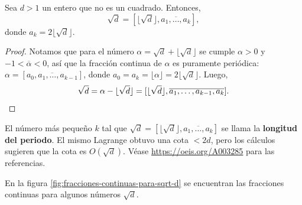 \begin{corolario}
  Sea $d > 1$ un entero que no es un cuadrado. Entonces,
  $$\sqrt{d} = [\lfloor\sqrt{d}\rfloor, \overline{a_1,\ldots,a_k}],$$
  donde $a_k = 2\lfloor\sqrt{d}\rfloor$.

  \begin{proof}
    Notamos que para el número $\alpha = \sqrt{d} + \lfloor\sqrt{d}\rfloor$
    se cumple $\alpha > 0$ y $-1 < \overline{\alpha} < 0$, así que la fracción
    continua de $\alpha$ es puramente periódica:
    $\alpha = [\overline{a_0,a_1,\ldots,a_{k-1}}]$,
    donde $a_0 = a_k = \lfloor\alpha\rfloor = 2\lfloor\sqrt{d}\rfloor$. Luego,
    \[ \sqrt{d} = \alpha - \lfloor\sqrt{d}\rfloor =
       [\lfloor\sqrt{d}\rfloor, \overline{a_1,\ldots,a_{k-1},a_k}]. \qedhere \]
  \end{proof}
\end{corolario}

\begin{comentario}
  El número más pequeño $k$ tal que
  $\sqrt{d} = [\lfloor\sqrt{d}\rfloor, \overline{a_1,\ldots,a_k}]$ se llama la
  \textbf{longitud del periodo}. El mismo Lagrange obtuvo una cota $< 2d$,
  pero los cálculos sugieren que la cota es $O (\sqrt{d})$. Véase
  \url{https://oeis.org/A003285} para las referencias.
\end{comentario}

En la figura \ref{fig:fracciones-continuas-para-sqrt-d} se encuentran las
fracciones continuas para algunos números $\sqrt{d}$.

